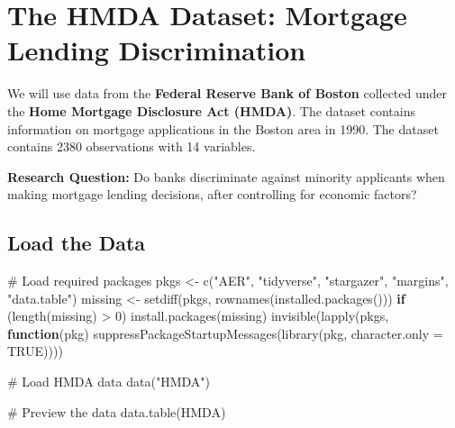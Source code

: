\documentclass[
  12pt,
  letterpaper,
]{scrbook}
\newenvironment{Shaded}{\begin{snugshade}}{\end{snugshade}}
\newcommand{\AttributeTok}[1]{\textcolor[rgb]{0.40,0.45,0.13}{#1}}
\newcommand{\CommentTok}[1]{\textcolor[rgb]{0.37,0.37,0.37}{#1}}
\newcommand{\ConstantTok}[1]{\textcolor[rgb]{0.56,0.35,0.01}{#1}}
\newcommand{\ControlFlowTok}[1]{\textcolor[rgb]{0.00,0.23,0.31}{\textbf{#1}}}
\newcommand{\DecValTok}[1]{\textcolor[rgb]{0.68,0.00,0.00}{#1}}
\newcommand{\FunctionTok}[1]{\textcolor[rgb]{0.28,0.35,0.67}{#1}}
\newcommand{\NormalTok}[1]{\textcolor[rgb]{0.00,0.23,0.31}{#1}}
\newcommand{\OtherTok}[1]{\textcolor[rgb]{0.00,0.23,0.31}{#1}}
\newcommand{\SpecialCharTok}[1]{\textcolor[rgb]{0.37,0.37,0.37}{#1}}
\newcommand{\StringTok}[1]{\textcolor[rgb]{0.13,0.47,0.30}{#1}}
\theoremstyle{plain}
\theoremstyle{definition}
\theoremstyle{remark}
\begin{document}
\section{The HMDA Dataset: Mortgage Lending
Discrimination}\label{the-hmda-dataset-mortgage-lending-discrimination}

We will use data from the \textbf{Federal Reserve Bank of Boston}
collected under the \textbf{Home Mortgage Disclosure Act (HMDA)}. The
dataset contains information on mortgage applications in the Boston area
in 1990. The dataset contains 2380 observations with 14 variables.

\textbf{Research Question:} Do banks discriminate against minority
applicants when making mortgage lending decisions, after controlling for
economic factors?

\subsection{Load the Data}\label{load-the-data}

\begin{Shaded}
\begin{Highlighting}[]
\CommentTok{\# Load required packages}
\NormalTok{pkgs }\OtherTok{\textless{}{-}} \FunctionTok{c}\NormalTok{(}\StringTok{"AER"}\NormalTok{, }\StringTok{"tidyverse"}\NormalTok{, }\StringTok{"stargazer"}\NormalTok{, }\StringTok{"margins"}\NormalTok{, }\StringTok{"data.table"}\NormalTok{)}
\NormalTok{missing }\OtherTok{\textless{}{-}} \FunctionTok{setdiff}\NormalTok{(pkgs, }\FunctionTok{rownames}\NormalTok{(}\FunctionTok{installed.packages}\NormalTok{()))}
\ControlFlowTok{if}\NormalTok{ (}\FunctionTok{length}\NormalTok{(missing) }\SpecialCharTok{\textgreater{}} \DecValTok{0}\NormalTok{) }\FunctionTok{install.packages}\NormalTok{(missing)}
\FunctionTok{invisible}\NormalTok{(}\FunctionTok{lapply}\NormalTok{(pkgs, }\ControlFlowTok{function}\NormalTok{(pkg) }\FunctionTok{suppressPackageStartupMessages}\NormalTok{(}\FunctionTok{library}\NormalTok{(pkg, }\AttributeTok{character.only =} \ConstantTok{TRUE}\NormalTok{))))}

\CommentTok{\# Load HMDA data}
\FunctionTok{data}\NormalTok{(}\StringTok{"HMDA"}\NormalTok{)}

\CommentTok{\# Preview the data}
\FunctionTok{data.table}\NormalTok{(HMDA)}
\end{Highlighting}
\end{Shaded}
\end{document}
